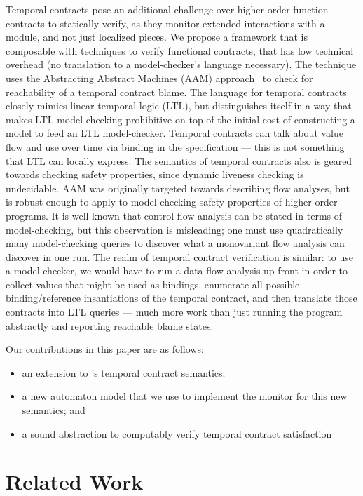 Temporal contracts pose an additional challenge over higher-order function contracts to statically verify, as they monitor extended interactions with a module, and not just localized pieces.
%
We propose a framework that is composable with techniques to verify functional contracts, that has low technical overhead (no translation to a model-checker's language necessary).
%
The technique uses the Abstracting Abstract Machines (AAM) approach~\citet{dvanhorn:VanHorn2010Abstracting} to check for reachability of a temporal contract blame.
%
The language for temporal contracts closely mimics linear temporal logic (LTL), but distinguishes itself in a way that makes LTL model-checking prohibitive on top of the initial cost of constructing a model to feed an LTL model-checker.
%
Temporal contracts can talk about value flow and use over time via binding in the specification --- this is not something that LTL can locally express.
%
The semantics of temporal contracts also is geared towards checking safety properties, since dynamic liveness checking is undecidable.
%
AAM was originally targeted towards describing flow analyses, but is robust enough to apply to model-checking safety properties of higher-order programs.
%
It is well-known that control-flow analysis can be stated in terms of model-checking, but this observation is misleading; one must use quadratically many model-checking queries to discover what a monovariant flow analysis can discover in one run.
%
The realm of temporal contract verification is similar: to use a model-checker, we would have to run a data-flow analysis up front in order to collect values that might be used as bindings, enumerate all possible binding/reference insantiations of the temporal contract, and then translate those contracts into LTL queries --- much more work than just running the program abstractly and reporting reachable blame states.
%

Our contributions in this paper are as follows:
\begin{itemize}
 \item{an extension to \citeauthor{ianjohnson:dfm:icfp2011}'s temporal contract semantics;}
 \item{a new automaton model that we use to implement the monitor for this new semantics; and}
 \item{a sound abstraction to computably verify temporal contract satisfaction}
\end{itemize}

\section{Related Work}

